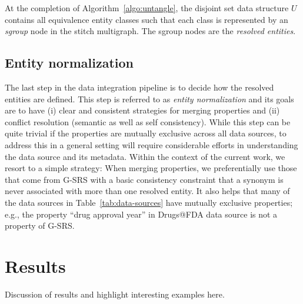 \documentclass{bioinfo}
\begin{document}
\begin{methods}
At the completion of Algorithm~\ref{algo:untangle}, the disjoint set
data structure $U$ contains all equivalence entity classes such that
each class is represented by an \emph{sgroup} node in the stitch
multigraph. The sgroup nodes are the \emph{resolved entities}.

\subsection{Entity normalization}
The last step in the data integration pipeline is to decide how the
resolved entities are defined. This step is referred to as \emph{entity
normalization} and its goals are to have (i) clear and consistent
strategies for merging properties and (ii) conflict resolution
(semantic as well as self consistency). While this step can be quite
trivial if the properties are mutually exclusive across all data
sources, to address this in a general setting will require considerable
efforts in understanding the data source and its metadata. Within the
context of the current work, we resort to a simple strategy: When
merging properties, we preferentially use those that come from G-SRS
with a basic consistency constraint that a synonym is never associated
with more than one resolved entity. It also helps that many of the
data sources in Table~\ref{tab:data-sources} have mutually exclusive
properties; e.g., the property ``drug approval year'' in Drugs@FDA
data source is not a property of G-SRS.

\end{methods}

\section{Results}
Discussion of results and highlight interesting examples here.
\end{document}
